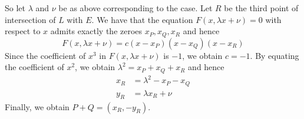 So let $\lambda$ and $\nu$ be as above corresponding to the case.
Let $R$ be the third point of intersection of $L$ with $E$.
We have that the equation $F(x, \lambda x + \nu) = 0$ with respect to $x$
admits exactly the zeroes $x_P, x_Q, x_R$ and hence
\begin{equation*}
	F(x, \lambda x + \nu) = c(x - x_P)(x - x_Q)(x - x_R)
\end{equation*}
Since the coefficient of $x^3$ in $F(x, \lambda x + \nu)$ is $-1$, we obtain
$c = -1$. By equating the coefficient of $x^2$, we obtain
$\lambda^2 = x_P + x_Q + x_R$ and hence
\begin{align*}
	x_R &= \lambda^2 - x_P - x_Q\\
	y_R &= \lambda x_R + \nu
\end{align*}
Finally, we obtain $P + Q = (x_R, -y_R)$.
